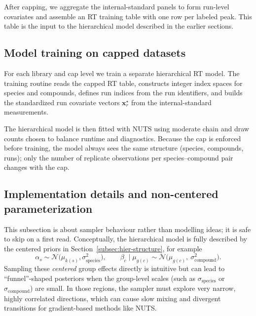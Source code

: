 \documentclass[11pt]{article}
\begin{document}
After capping, we aggregate the internal-standard panels to form run-level covariates
and assemble an RT training table with one row per labeled peak. This table is the
input to the hierarchical model described in the earlier sections.

\subsection{Model training on capped datasets}

For each library and cap level we train a separate hierarchical RT model. The training
routine reads the capped RT table, constructs integer index spaces for species and
compounds, defines run indices from the run identifiers, and builds the standardized
run covariate vectors $\bm{x}^{\star}_r$ from the internal-standard measurements.

The hierarchical model is then fitted with NUTS using moderate chain and draw counts
chosen to balance runtime and diagnostics. Because the cap is enforced before
training, the model always sees the same structure (species, compounds, runs); only
the number of replicate observations per species--compound pair changes with the cap.

\subsection{Implementation details and non-centered parameterization}
\label{subsec:rt-noncentered}

This subsection is about sampler behaviour rather than modelling ideas; it is safe to
skip on a first read. Conceptually, the hierarchical model is fully described by the
centered priors in Section~\ref{subsec:hier-structure}, for example
\begin{equation}
  \alpha_{s}\sim\mathcal{N}\!\bigl(\mu_{k(s)},\sigma^2_{\mathrm{species}}\bigr),
  \qquad
  \beta_{c}\mid\mu_{g(c)}\sim
  \mathcal{N}\bigl(\mu_{g(c)},\ \sigma^2_{\mathrm{compound}}\bigr).
\end{equation}
Sampling these \emph{centered} group effects directly is intuitive but can lead to
``funnel''-shaped posteriors when the group-level scales (such as
$\sigma_{\mathrm{species}}$ or $\sigma_{\mathrm{compound}}$) are small. In those
regions, the sampler must explore very narrow, highly correlated directions, which can
cause slow mixing and divergent transitions for gradient-based methods like NUTS.
\end{document}
